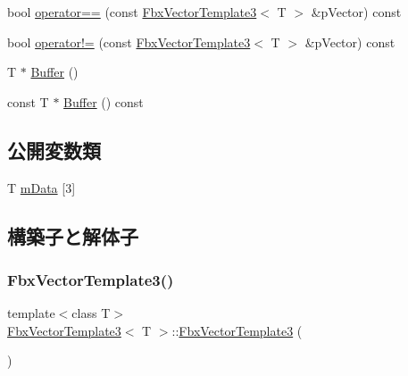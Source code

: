 \begin{DoxyCompactItemize}
\item 
bool \hyperlink{class_fbx_vector_template3_aed608afc6dbe8e27447be99120546582}{operator==} (const \hyperlink{class_fbx_vector_template3}{Fbx\+Vector\+Template3}$<$ T $>$ \&p\+Vector) const
\item 
bool \hyperlink{class_fbx_vector_template3_acf6fb2023f555ec2912566031918aa31}{operator!=} (const \hyperlink{class_fbx_vector_template3}{Fbx\+Vector\+Template3}$<$ T $>$ \&p\+Vector) const
\item 
T $\ast$ \hyperlink{class_fbx_vector_template3_abff5302d7b86d9ae65615839bfb4458b}{Buffer} ()
\item 
const T $\ast$ \hyperlink{class_fbx_vector_template3_ae5a5582d606a687f346f470d94ff551d}{Buffer} () const
\end{DoxyCompactItemize}
\subsection*{公開変数類}
\begin{DoxyCompactItemize}
\item 
T \hyperlink{class_fbx_vector_template3_a63f8316f392b536de41dfaa2031a2d54}{m\+Data} \mbox{[}3\mbox{]}
\end{DoxyCompactItemize}


\subsection{構築子と解体子}
\mbox{\label{class_fbx_vector_template3_a3a0d3989e58b800da934f7810410ea9a}} 
\subsubsection{\texorpdfstring{Fbx\+Vector\+Template3()}{FbxVectorTemplate3()}\hspace{0.1cm}{\footnotesize\ttfamily [1/3]}}
{\footnotesize\ttfamily template$<$class T$>$ \\
\hyperlink{class_fbx_vector_template3}{Fbx\+Vector\+Template3}$<$ T $>$\+::\hyperlink{class_fbx_vector_template3}{Fbx\+Vector\+Template3} (\begin{DoxyParamCaption}{ }\end{DoxyParamCaption})}

